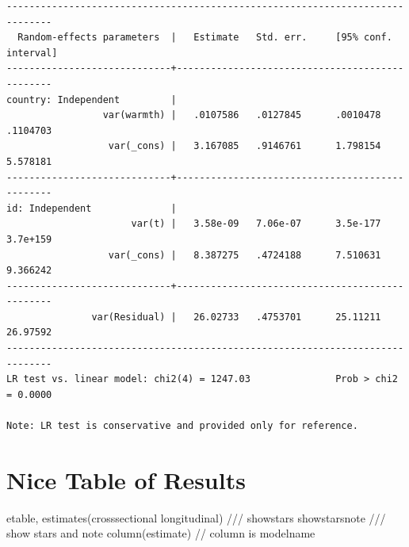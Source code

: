 \documentclass[
  letterpaper,
  DIV=11,
  numbers=noendperiod]{scrreprt}
\newenvironment{Shaded}{\begin{snugshade}}{\end{snugshade}}
\newcommand{\CommentTok}[1]{\textcolor[rgb]{0.37,0.37,0.37}{#1}}
\newcommand{\KeywordTok}[1]{\textcolor[rgb]{0.00,0.23,0.31}{#1}}
\newcommand{\NormalTok}[1]{\textcolor[rgb]{0.00,0.23,0.31}{#1}}
\begin{document}
\begin{verbatim}
------------------------------------------------------------------------------
  Random-effects parameters  |   Estimate   Std. err.     [95% conf. interval]
-----------------------------+------------------------------------------------
country: Independent         |
                 var(warmth) |   .0107586   .0127845      .0010478    .1104703
                  var(_cons) |   3.167085   .9146761      1.798154    5.578181
-----------------------------+------------------------------------------------
id: Independent              |
                      var(t) |   3.58e-09   7.06e-07      3.5e-177    3.7e+159
                  var(_cons) |   8.387275   .4724188      7.510631    9.366242
-----------------------------+------------------------------------------------
               var(Residual) |   26.02733   .4753701      25.11211    26.97592
------------------------------------------------------------------------------
LR test vs. linear model: chi2(4) = 1247.03               Prob > chi2 = 0.0000

Note: LR test is conservative and provided only for reference.
\end{verbatim}

\section{Nice Table of Results}\label{nice-table-of-results}

\begin{Shaded}
\begin{Highlighting}[]

\NormalTok{etable, }\KeywordTok{estimates}\NormalTok{(crosssectional longitudinal) }\CommentTok{///}
\NormalTok{showstars showstarsnote }\CommentTok{/// show stars and note}
\NormalTok{column(estimate) }\CommentTok{// column is modelname}
\end{Highlighting}
\end{Shaded}
\end{document}
